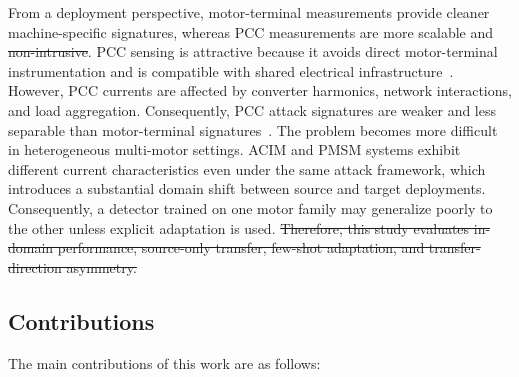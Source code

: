 \documentclass[letterpaper,journal]{IEEEtran}
\providecommand{\DIFadd}[1]{{\protect\color{blue}\uwave{#1}}} %
\providecommand{\DIFdel}[1]{{\protect\color{red}\sout{#1}}}                      %
\providecommand{\DIFaddbegin}{} %
\providecommand{\DIFaddend}{} %
\providecommand{\DIFdelbegin}{} %
\providecommand{\DIFdelend}{} %
\begin{document}
From a deployment perspective, motor-terminal measurements provide cleaner machine-specific signatures, whereas PCC measurements are more scalable and \DIFdelbegin \DIFdel{non-intrusive}\DIFdelend \DIFaddbegin \DIFadd{nonintrusive}\DIFaddend . PCC sensing is attractive because it avoids direct motor-terminal instrumentation and is compatible with shared electrical infrastructure~\cite{7271086}. However, PCC currents are affected by converter harmonics, network interactions, and load aggregation. Consequently, PCC attack signatures are weaker and less separable than motor-terminal signatures~\cite{10005067}.
The problem becomes more difficult in heterogeneous multi-motor settings. ACIM and PMSM systems exhibit different current characteristics even under the same attack framework, which introduces a substantial domain shift between source and target deployments. Consequently, a detector trained on one motor family may generalize poorly to the other unless explicit adaptation is used.
\DIFdelbegin \DIFdel{Therefore, this study evaluates in-domain performance, source-only transfer, few-shot adaptation, and transfer-direction asymmetry.
}\DIFdelend \subsection{Contributions}
\label{sec:contributions}
The main contributions of this work are as follows:
\end{document}
